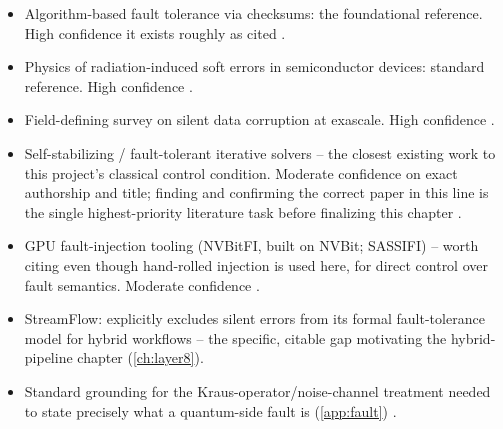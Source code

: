 \begin{itemize}
  \item Algorithm-based fault tolerance via checksums: the foundational reference. High confidence it exists roughly as cited \citep{huang1984abft}.
  \item Physics of radiation-induced soft errors in semiconductor devices: standard reference. High confidence \citep{baumann2005radiation}.
  \item Field-defining survey on silent data corruption at exascale. High confidence \citep{snir2014exascale}.
  \item Self-stabilizing / fault-tolerant iterative solvers -- the closest existing work to this project's classical control condition. Moderate confidence on exact authorship and title; finding and confirming the correct paper in this line is the single highest-priority literature task before finalizing this chapter \citep{sao2013selfstabilizing}.
  \item GPU fault-injection tooling (NVBitFI, built on NVBit; SASSIFI) -- worth citing even though hand-rolled injection is used here, for direct control over fault semantics. Moderate confidence \citep{villa2019nvbit,hari2017sassifi}.
  \item StreamFlow: explicitly excludes silent errors from its formal fault-tolerance model for hybrid workflows -- the specific, citable gap motivating the hybrid-pipeline chapter (\autoref{ch:layer8}).
  \item Standard grounding for the Kraus-operator/noise-channel treatment needed to state precisely what a quantum-side fault is (\autoref{app:fault}) \citep{nielsen2010quantum}.
\end{itemize}